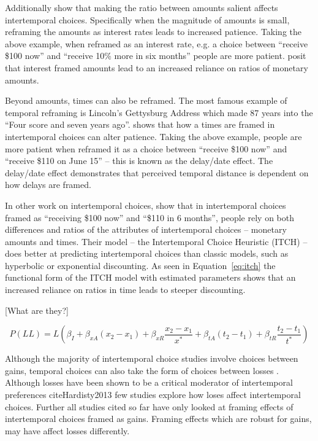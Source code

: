 \documentclass[]{article}
\begin{document}
Additionally  show that making the ratio between amounts salient affects intertemporal choices. 
Specifically when the magnitude of amounts is small, reframing the amounts as interest rates leads to increased patience. Taking the above example, when reframed as an interest rate, e.g.  a choice between  ``receive \$100 now'' and ``receive 10\% more in six months'' people are more patient.  posit that interest framed amounts lead to an increased reliance on ratios of monetary amounts.

Beyond amounts, times can also be reframed.
The most famous example of temporal reframing is  Lincoln's Gettysburg Address which made 87 years into the ``Four score and seven years ago''.
 shows that how a times are framed in intertemporal choices can alter patience. 
Taking the above example, people are more patient when reframed it as a choice between  ``receive \$100 now'' and ``receive \$110 on June 15'' -- this is known as the delay/date effect. 
The delay/date effect demonstrates that perceived temporal distance is dependent on how delays are framed. 

In other work on intertemporal choices,  show that in intertemporal choices framed as ``receiving \$100 now'' and ``\$110 in 6 months'', people rely on both differences and ratios of the  attributes of intertemporal choices -- monetary amounts and times.
Their model -- the Intertemporal Choice Heuristic (ITCH) -- does better at predicting intertemporal choices than classic models, such as hyperbolic or exponential discounting. 
As seen in Equation~\ref{eq:itch}  the functional form of the ITCH model with estimated parameters shows that an increased reliance on ratios in time leads to steeper discounting. 

[What are they?]
 
 \begin{equation}\label{eq:itch}
 P(LL) = L \left(\beta_I + \beta_{xA}(x_2 - x_1) + \beta_{xR} \frac{x_2 - x_1}{x^*} + \beta_{tA}(t_2 - t_1) + \beta_{tR} \frac{t_2 - t_1}{t^*}\right)
 \end{equation}
 
Although the majority of intertemporal choice studies involve choices between gains, temporal choices can also take the form of choices between losses \cite{Hardisty2013, Hardisty2015}. 
Although losses have been shown to be a critical moderator of intertemporal preferences cite{Hardisty2013} few studies explore how loses affect intertemporal choices.
Further all studies cited so far have only looked at framing effects of intertemporal choices framed as gains. 
Framing effects which are robust for gains, may have affect losses differently.  
\end{document}
